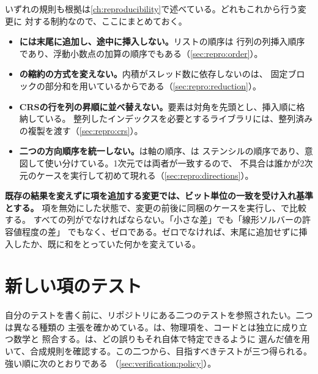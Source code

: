 \begin{warn}[四つの規則と一つの受け入れ基準]
  いずれの規則も根拠は\cref{ch:reproducibility}で述べている。どれもこれから行う変更に
  対する制約なので、ここにまとめておく。

  \begin{itemize}
    \item \textbf{には末尾に追加し、途中に挿入しない。}リストの順序は
      行列の列挿入順序であり、浮動小数点の加算の順序でもある（\cref{sec:repro:order}）。
    \item \textbf{の縮約の方式を変えない。}内積がスレッド数に依存しないのは、
      固定ブロックの部分和を用いているからである（\cref{sec:repro:reduction}）。
    \item \textbf{CRSの行を列の昇順に並べ替えない。}要素は対角を先頭とし、挿入順に格納している。
      整列したインデックスを必要とするライブラリには、整列済みの複製を渡す（\cref{sec:repro:crs}）。
    \item \textbf{二つの方向順序を統一しない。}は軸の順序、は
      ステンシルの順序であり、意図して使い分けている。1次元では両者が一致するので、
      不具合は誰かが2次元のケースを実行して初めて現れる（\cref{sec:repro:directions}）。
  \end{itemize}

  \textbf{既存の結果を変えずに項を追加する変更では、ビット単位の一致を受け入れ基準とする。}
  項を無効にした状態で、変更の前後に同梱のケースを実行し、で比較する。
  すべての列がでなければならない。「小さな差」でも「線形ソルバーの許容値程度の差」
  でもなく、ゼロである。ゼロでなければ、末尾に追加せずに挿入したか、既に和をとっていた何かを変えている。
\end{warn}

\section{新しい項のテスト}
\label{sec:extending:testing}

自分のテストを書く前に、リポジトリにある二つのテストを参照されたい。二つは異なる種類の
主張を確かめている。は、物理項を、コードとは独立に成り立つ数学と
照合する。は、どの誤りもそれ自体で特定できるように
選んだ値を用いて、合成規則を確認する。この二つから、目指すべきテストが三つ得られる。強い順に次のとおりである
（\cref{sec:verification:policy}）。

